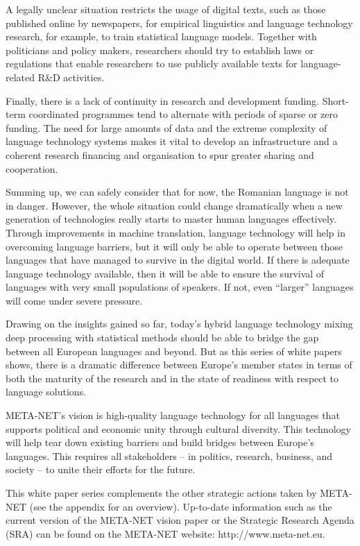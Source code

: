 \begin{multicols}{2}
A legally unclear situation restricts the usage of digital texts, such as those published online by newspapers, for empirical linguistics and language technology research, for example, to train statistical language models. Together with politicians and policy makers, researchers should try to establish laws or regulations that enable researchers to use publicly available texts for language-related R\&D activities.

Finally, there is a lack of continuity in research and development funding. Short-term coordinated programmes tend to alternate with periods of sparse or zero funding. The need for large amounts of data and the extreme complexity of language technology systems makes it vital to develop an infrastructure and a coherent research financing and organisation to spur greater sharing and cooperation.

Summing up, we can safely consider that for now, the Romanian language is not in danger. However, the whole situation could change dramatically when a new generation of technologies really starts to master human languages effectively. Through improvements in machine translation, language technology will help in overcoming language barriers, but it will only be able to operate between those languages that have managed to survive in the digital world. If there is adequate language technology available, then it will be able to ensure the survival of languages with very small populations of speakers. If not, even ``larger'' languages will come under severe pressure.


Drawing on the insights gained so far, today’s hybrid language technology mixing deep processing with statistical methods should be able to bridge the gap between all European languages and beyond. But as this series of white papers shows, there is a dramatic difference between Europe's member states in terms of both the maturity of the research and in the state of readiness with respect to language solutions.  

META-NET’s vision is high-quality language technology for all languages that supports political and economic unity through cultural diversity. This technology will help tear down existing barriers and build bridges between Europe’s languages. This requires all stakeholders -- in politics, research, business, and society -- to unite their efforts for the future.

This white paper series complements the other strategic actions taken by META-NET (see the appendix for an overview). Up-to-date information such as the current version of the META-NET vision paper \cite{Meta1} or the Strategic Research Agenda (SRA) can be found on the META-NET website: http://www.meta-net.eu.
\end{multicols}

